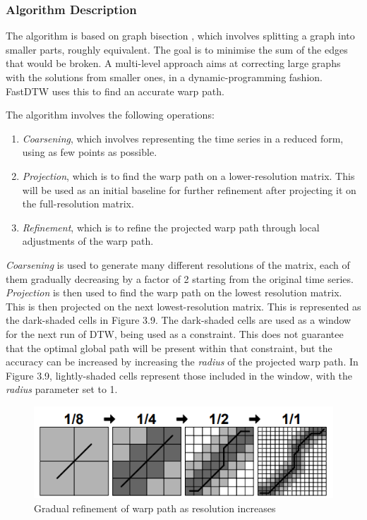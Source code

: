 \documentclass[final,rdr32.tex]{subfiles}
\begin{document}
\subsubsection{Algorithm Description}

The algorithm is based on graph bisection \cite{karypis1997multilevel}, which involves splitting a graph into smaller parts, roughly equivalent. The goal is to minimise the sum of the edges that would be broken. A multi-level approach aims at correcting large graphs with the solutions from smaller ones, in a dynamic-programming fashion. FastDTW uses this to find an accurate warp path.

The algorithm involves the following operations:
\begin{enumerate}
    \item \textit{Coarsening}, which involves representing the time series in a reduced form, using as few points as possible.
    \item \textit{Projection}, which is to find the warp path on a lower-resolution matrix. This will be used as an initial baseline for further refinement after projecting it on the full-resolution matrix.
    \item \textit{Refinement}, which is to refine the projected warp path through local adjustments of the warp path.
\end{enumerate}

\textit{Coarsening} is used to generate many different resolutions of the matrix, each of them gradually decreasing by a factor of 2 starting from the original time series. \textit{Projection} is then used to find the warp path on the lowest resolution matrix. This is then projected on the next lowest-resolution matrix. This is represented as the dark-shaded cells in Figure 3.9. The dark-shaded cells are used as a window for the next run of DTW, being used as a constraint. This does not guarantee that the optimal global path will be present within that constraint, but the accuracy can be increased by increasing the \textit{radius} of the projected warp path. In Figure 3.9, lightly-shaded cells represent those included in the window, with the \textit{radius} parameter set to 1.

\begin{figure}[H]
    \begin{center}
        \includegraphics[scale=0.9]{images/fastdtw.png}
        \caption{Gradual refinement of warp path as resolution increases}
    \end{center}
\end{figure}
\end{document}
